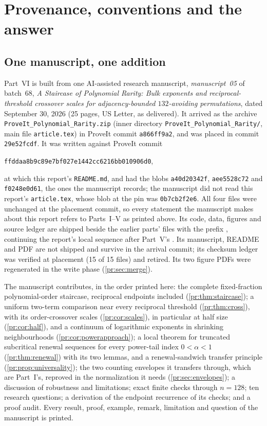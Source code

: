 \documentclass[11pt,a4paper]{article}
\theoremstyle{definition}\newaliascnt{definition}{theorem}
\theoremstyle{remark}\newaliascnt{remark}{theorem}
\newcommand{\prsha}{\texttt{ffddaa8b9c89e7bf027e1442cc6216bb010906d0}}
\begin{document}
\section{Provenance, conventions and the answer}
\label{pr:sec:intro}

\subsection{One manuscript, one addition}
\label{pr:sec:source}
Part~VI is built from one AI-assisted research manuscript,
\emph{manuscript~05} of batch~68, \emph{A Staircase of Polynomial Rarity:
Bulk exponents and reciprocal-threshold crossover scales for
adjacency-bounded $132$-avoiding permutations}, dated September 30, 2026
(25 pages, US Letter, as delivered). It arrived as the archive
\texttt{ProveIt\_Polynomial\_Rarity.zip} (inner directory
\texttt{ProveIt\_Polynomial\_Rarity/}, main file \texttt{article.tex}) in
ProveIt commit \texttt{a866ff9a2}, and was placed in commit
\texttt{29e52fcdf}. It was written against ProveIt commit
\begin{center}\small\prsha,\end{center}
at which this report's \texttt{README.md},  and
 had the blobs
\texttt{a40d20342f}, \texttt{aee5528c72} and \texttt{f0248e0d61}, the ones
the manuscript records; the manuscript did not read this report's
\texttt{article.tex}, whose blob at the pin was \texttt{0b7cb2f2e6}. All four
files were unchanged at the placement commit, so every statement the
manuscript makes about this report refers to Parts~I--V as printed above.
Its code, data, figures and source ledger are shipped beside the earlier
parts' files with the prefix , continuing the
report's local sequence after Part~V's . Its
manuscript, README and PDF are not shipped and survive in the arrival
commit; its checksum ledger was verified at placement (15 of 15 files) and
retired. Its two figure PDFs were regenerated in the write phase
(\cref{pr:sec:merge}).

The manuscript contributes, in the order printed here: the complete
fixed-fraction polynomial-order staircase, reciprocal endpoints included
(\cref{pr:thm:staircase}); a uniform two-term comparison near every
reciprocal threshold (\cref{pr:thm:cross}), with its order-crossover scales
(\cref{pr:cor:scales}), in particular at half size (\cref{pr:cor:half}), and
a continuum of logarithmic exponents in shrinking neighbourhoods
(\cref{pr:cor:powerapproach}); a local theorem for truncated subcritical
renewal sequences for every power-tail index $0<\alpha<1$
(\cref{pr:thm:renewal}) with its two lemmas, and a renewal-sandwich transfer
principle (\cref{pr:prop:universality}); the two counting envelopes it
transfers through, which are Part~I's, reproved in the normalization it needs
(\cref{pr:sec:envelopes}); a discussion of robustness and limitations; exact
finite checks through $n=128$; ten research questions; a derivation of the
endpoint recurrence of its checks; and a proof audit. Every result, proof,
example, remark, limitation and question of the manuscript is printed.
\end{document}

